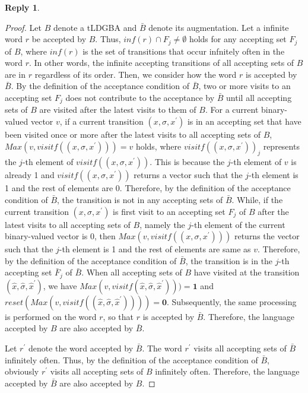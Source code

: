 \documentclass[10 pt, dvipdfmx]{article}
\theoremstyle{definition}
\newtheorem{review point}{Review Point}[section]
\newtheorem*{reply}{Reply}
\begin{document}
\begin{reply}
  \begin{proof}
    Let $B$ denote a tLDGBA and $\bar{B}$ denote its augmentation. Let a infinite word $r$ be accepted by $B$. Thus, $inf(r) \cap F_j \neq \emptyset$ holds for any accepting set $F_j$ of $B$, where $inf(r)$ is the set of transitions that occur infnitely often in the word $r$. In other words, the infinite accepting transitions of all accepting sets of $B$ are in $r$ regardless of its order. Then, we consider how the word $r$ is accepted by $\bar{B}$. By the definition of the acceptance condition of $\bar{B}$, two or more visits to an accepting set $F_j$ does not contribute to the acceptance by $\bar{B}$ until all accepting sets of $B$ are visited after the latest visits to them of $B$. For a current binary-valued vector $v$, if a current transition $(x,\sigma,x^{\prime})$ is in an accepting set that have been visited once or more after the latest visits to all accepting sets of $B$, $Max(v, visitf((x,\sigma,x^{\prime}))) = v$ holds, where $visitf((x,\sigma,x^{\prime}))_j$ represents the $j$-th element of $visitf((x,\sigma,x^{\prime}))$. This is because the $j$-th element of $v$ is already 1 and $visitf((x,\sigma,x^{\prime}))$ returns a vector such that the $j$-th element is 1 and the rest of elements are 0. Therefore, by the definition of the acceptance condition of $\bar{B}$, the transition is not in any accepting sets of $\bar{B}$.
    While, if the current transition $(x,\sigma,x^{\prime})$ is first visit to an accepting set $F_j$ of $B$ after the latest visits to all accepting sets of $B$, namely the $j$-th element of the current binary-valued vector is $0$, then $Max(v, visitf((x,\sigma,x^{\prime})))$ returns the vector such that the $j$-th element is 1 and the rest of elements are same as $v$. Therefore, by the definition of the acceptance condition of $\bar{B}$, the transition is in the $j$-th accepting set $\bar{F}_j$ of $\bar{B}$.
    When all accepting sets of $B$ have visited at the transition $(\hat{x},\hat{\sigma},\hat{x}^{\prime})$, we have $Max(v, visitf(\hat{x},\hat{\sigma},\hat{x}^{\prime}))) = \bm{1}$ and $reset(Max(v, visitf((\hat{x},\hat{\sigma},\hat{x}^{\prime})))) = \bm{0}$. Subsequently, the same processing is performed on the word $r$, so that $r$ is accepted by $\bar{B}$. Therefore, the language accepted by $B$ are also accepted by $\bar{B}$.

    Let $r^{\prime}$ denote the word accepted by $\bar{B}$. The word $r^{\prime}$ visits all accepting sets of $\bar{B}$ infinitely often. Thus, by the definition of the acceptance condition of $\bar{B}$, obviously $r^{\prime}$ visits all accepting sets of $B$ infinitely often. Therefore, the language accepted by $\bar{B}$ are also accepted by $B$.
  \end{proof}
\end{reply}
\end{document}
